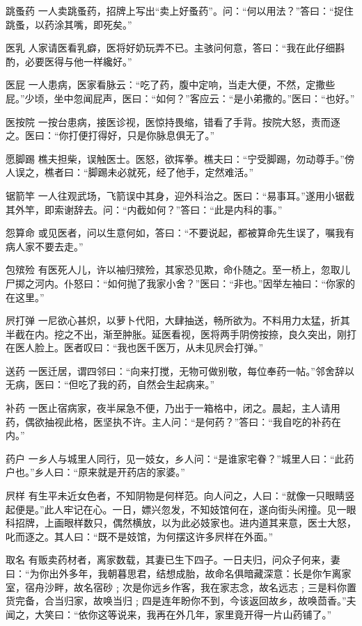 \documentclass[12pt,UTF8]{ctexbook}
\begin{document}
跳蚤药
一人卖跳蚤药，招牌上写出“卖上好蚤药”。问：“何以用法？”答曰：“捉住跳蚤，以药涂其嘴，即死矣。”

医乳
人家请医看乳癖，医将好奶玩弄不已。主骇问何意，答曰：“我在此仔细斟酌，必要医得与他一样纔好。”

医屁
一人患病，医家看脉云：“吃了药，腹中定响，当走大便，不然，定撒些屁。”少顷，坐中忽闻屁声，医曰：“如何？”客应云：“是小弟撒的。”医曰：“也好。”

医按院
一按台患病，接医诊视，医惊持畏缩，错看了手背。按院大怒，责而逐之。医曰：“你打便打得好，只是你脉息俱无了。”

愿脚踢
樵夫担柴，误触医士。医怒，欲挥拳。樵夫曰：“宁受脚踢，勿动尊手。”傍人误之，樵者曰：“脚踢未必就死，经了他手，定然难活。”

锯箭竿
一人往观武场，飞箭误中其身，迎外科治之。医曰：“易事耳。”遂用小锯截其外竿，即索谢辞去。问：“内截如何？”答曰：“此是内科的事。”

怨算命
或见医者，问以生意何如，答曰：“不要说起，都被算命先生误了，嘱我有病人家不要去走。”

包殡殓
有医死人儿，许以袖归殡殓，其家恐见欺，命仆随之。至一桥上，忽取儿尸掷之河内。仆怒曰：“如何抛了我家小舍？”医曰：“非也。”因举左袖曰：“你家的在这里。”

屄打弹
一尼欲心甚炽，以萝卜代阳，大肆抽送，畅所欲为。不料用力太猛，折其半截在内。挖之不出，渐至肿胀。延医看视，医将两手阴傍按捺，良久突出，刚打在医人脸上。医者叹曰：“我也医千医万，从未见屄会打弹。”

送药
一医迁居，谓四邻曰：“向来打搅，无物可做别敬，每位奉药一帖。”邻舍辞以无病，医曰：“但吃了我的药，自然会生起病来。”

补药
一医止宿病家，夜半屎急不便，乃出于一箱格中，闭之。晨起，主人请用药，偶欲抽视此格，医坚执不许。主人问：“是何药？”答曰：“我自吃的补药在内。”

药户
一乡人与城里人同行，见一妓女，乡人问：“是谁家宅眷？”城里人曰：“此药户也。”乡人曰：“原来就是开药店的家婆。”

屄样
有生平未近女色者，不知阴物是何样范。向人问之，人曰：“就像一只眼睛竖起便是。”此人牢记在心。一日，嫖兴忽发，不知妓馆何在，遂向街头闲撞。见一眼科招牌，上画眼样数只，偶然横放，以为此必妓家也。进内道其来意，医士大怒，叱而逐之。其人曰：“既不是妓馆，为何摆这许多屄样在外面。”

取名
有贩卖药材者，离家数载，其妻已生下四子。一日夫归，问众子何来，妻曰：“为你出外多年，我朝暮思君，结想成胎，故命名俱暗藏深意：长是你乍离家室，宿舟沙畔，故名宿砂﹔次是你远乡作客，我在家志念，故名远志﹔三是料你置货完备，合当归家，故唤当归﹔四是连年盼你不到，今该返回故乡，故唤茴香。”夫闻之，大笑曰：“依你这等说来，我再在外几年，家里竟开得一片山药铺了。”
\end{document}
